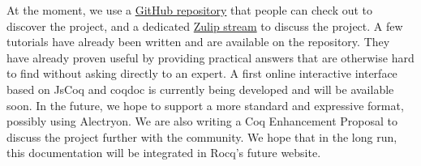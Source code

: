 \documentclass{easychair}
\begin{document}
At the moment, we use a \href{https://github.com/Zimmi48/platform-docs}{GitHub repository}
that people can check out to discover the project, and a dedicated
\href{https://coq.zulipchat.com/#narrow/stream/437203-Platform-docs}{Zulip stream}
to discuss the project.
A few tutorials have already been written and are available on the repository.
They have already proven useful by providing practical answers that are
otherwise hard to find without asking directly to an expert.
A first online interactive interface based on JsCoq and coqdoc is currently
being developed and will be available soon.
In the future, we hope to support a more standard and expressive format,
possibly using Alectryon.
We are also writing a Coq Enhancement Proposal to discuss the project further with the community.
We hope that in the long run, this documentation will be integrated in Rocq's
future website.

\label{sect:bib}


\end{document}
